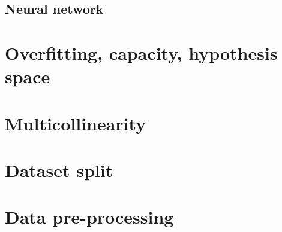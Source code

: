 \subsection{Neural network}

\section{Overfitting, capacity, hypothesis space}
\section{Multicollinearity}
\section{Dataset split} \label{sec:datasetsplit}


	
	
\section{Data pre-processing}


